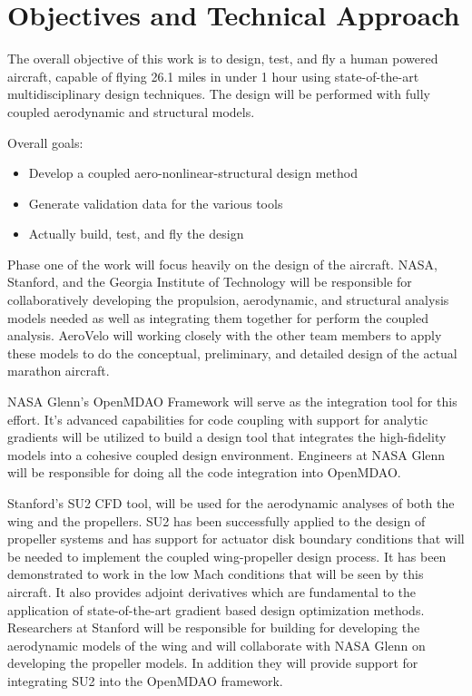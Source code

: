 \documentclass[]{report}
\begin{document}
  \section{Objectives and Technical Approach}

    The overall objective of this work is to design, test, and fly a human powered aircraft, 
    capable of flying 26.1 miles in under 1 hour using state-of-the-art multidisciplinary 
    design techniques. The design will be performed with fully coupled
    aerodynamic and structural models. 

    Overall goals: 
    \begin{itemize}
        \item Develop a coupled aero-nonlinear-structural design method 
        \item Generate validation data for the various tools 
        \item Actually build, test, and fly the design
    \end{itemize}

    Phase one of the work will focus heavily on the design of the aircraft. NASA, Stanford, 
    and the Georgia Institute of Technology will be responsible for collaboratively developing 
    the propulsion, aerodynamic, and structural analysis models needed as well as integrating them 
    together for perform the coupled analysis. AeroVelo will working closely with the other team members
    to apply these models to do the conceptual, preliminary, and detailed design of the actual 
    marathon aircraft. 

    NASA Glenn's OpenMDAO Framework will serve as the integration tool for this effort. It's advanced 
    capabilities for code coupling with support for analytic gradients will be utilized to build 
    a design tool that integrates the high-fidelity models into a cohesive coupled design environment. 
    Engineers at NASA Glenn will be responsible for doing all the code integration into OpenMDAO. 

    Stanford's SU2 CFD tool, will be used for the aerodynamic analyses of both the wing and 
    the propellers. SU2 has been successfully applied to the design of propeller systems 
    and has support for actuator disk boundary conditions that will be needed to implement 
    the coupled wing­-propeller design process. It has been demonstrated to work in the low 
    Mach conditions that will be seen by this aircraft. It also provides adjoint derivatives 
    which are fundamental to the application of state­-of-­the-­art gradient based design 
    optimization methods. Researchers at Stanford will be responsible for building for developing 
    the aerodynamic models of the wing and will collaborate with NASA Glenn on developing the 
    propeller models. In addition they will provide support for integrating SU2 into the OpenMDAO 
    framework. 
\end{document}
